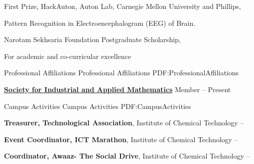 \documentclass[letterpaper,MMMyyyy,nonstopmode]{simpleresumecv}
\begin{document}
\begin{Body}
\Gap
\BulletItem
First Prize,
HackAuton, Auton Lab, Carnegie Mellon University and Phillips,
\hfill
{}
\begin{Detail}
\Item
Pattern Recognition in Electroencephalogram (EEG) of Brain.
\end{Detail}

\Gap
\BulletItem
Narotam Sekhsaria Foundation Postgraduate Scholarship,
\hfill
{}
\begin{Detail}
\Item
For academic and co-curricular excellence
\end{Detail}


\Section
{Professional Affiliations}
{Professional Affiliations}
{PDF:ProfessionalAffiliations}

\Entry
\href{http://www.siam.org/}
{\textbf{Society for Industrial and Applied Mathematics}}
\Gap
\BulletItem
Member
\hfill
{} --
Present


\Section
{Campus Activities}
{Campus Activities}
{PDF:CampusActivities}

\Entry
\textbf{Treasurer, Technological Association},
Institute of Chemical Technology
\hfill
{} --

\Entry
\textbf{Event Coordinator, ICT Marathon},
Institute of Chemical Technology
\hfill
{} --

\Entry
\textbf{Coordinator, Awaaz- The Social Drive},
Institute of Chemical Technology
\hfill
{} --

\end{Body}
\end{document}
